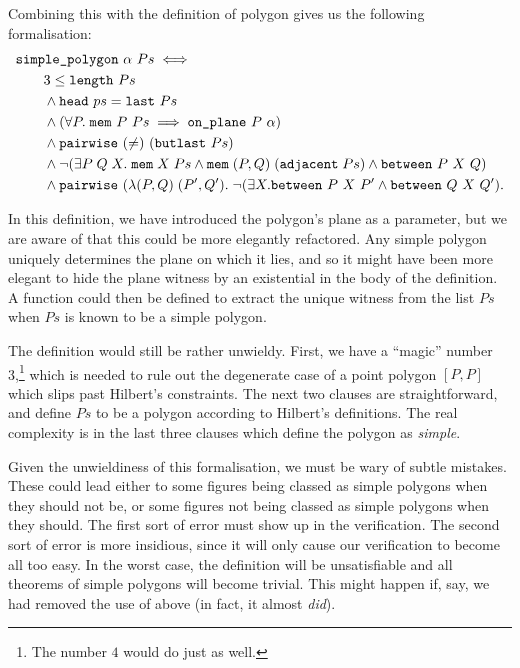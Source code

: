 Combining this with the definition of polygon gives us the following formalisation:
\begin{equation}\label{eq:SimplePolygonDef}
  \begin{split}
    &\code{simple\_polygon}\ \alpha\ Ps \iff \\
    &\qquad 3 \leq \code{length}\ Ps\\
    &\qquad\wedge \code{head}\ ps = \code{last}\ Ps\\
    &\qquad\wedge (\forall P.\;\code{mem}\ P\ Ps \implies \code{on\_plane}\ P\ \alpha)\\
    &\qquad\wedge \code{pairwise}\ (\neq)\ (\code{butlast}\ Ps)\\
    &\qquad\wedge \neg(\exists P\;Q\;X.\; \code{mem}\;X\;Ps\wedge\code{mem}\;(P,Q)\;(\code{adjacent}\;Ps)\wedge\between{P}{X}{Q})\\
    &\qquad\wedge \code{pairwise}\ (\lambda(P,Q)\;(P',Q').\;\neg(\exists X. \between{P}{X}{P'} \wedge \between{Q}{X}{Q'}).
  \end{split}
\end{equation}

In this definition, we have introduced the polygon's plane as a parameter, but we are aware of that this could be more elegantly refactored. Any simple polygon uniquely determines the plane on which it lies, and so it might have been more elegant to hide the plane witness by an existential in the body of the definition. A function could then be defined to extract the unique witness from the list $Ps$ when $Ps$ is known to be a simple polygon. 

The definition would still be rather unwieldy. First, we have a ``magic'' number 3,\footnote{The number $4$ would do just as well.} which is needed to rule out the degenerate case of a point polygon $[P,P]$ which slips past Hilbert's constraints. The next two clauses are straightforward, and define $Ps$ to be a polygon according to Hilbert's definitions. The real complexity is in the last three clauses which define the polygon as \emph{simple}. 

Given the unwieldiness of this formalisation, we must be wary of subtle mistakes. These could lead either to some figures being classed as simple polygons when they should not be, or some figures not being classed as simple polygons when they should. The first sort of error must show up in the verification. The second sort of error is more insidious, since it will only cause our verification to become all too easy. In the worst case, the definition will be unsatisfiable and all theorems of simple polygons will become trivial. This might happen if, say, we had removed the use of  above (in fact, it almost \emph{did}).

